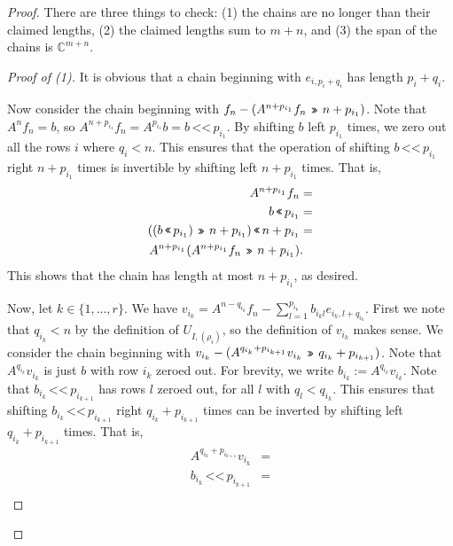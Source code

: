 \documentclass[12pt,psamsfonts]{article}
\newcommand{\leftshift}{\,\texttt{<<}\,}
\newcommand{\rightshift}{\mathbin{\rotatebox[origin=c]{180}{\leftshift}}}
\begin{document}
\begin{proof}
    There are three things to check: (1) the chains are no longer than their claimed lengths, (2) the claimed lengths sum to \(m + n\), and (3) the span of the chains is \(\mathbb{C}^{m + n}\).
    \begin{proof}[Proof of (1)]
        It is obvious that a chain beginning with \(e_{i, p_i + q_i}\) has length \(p_i + q_i\).
        \par Now consider the chain beginning with \(f_n - (A^{n + p_{i_1}} f_n \rightshift n + p_{i_1})\).
        Note that \(A^n f_n = b\), so \(A^{n + p_{i_1}} f_n = A^{p_{i_1}} b = b \leftshift p_{i_1}\).
        By shifting \(b\) left \(p_{i_1}\) times, we zero out all the rows \(i\) where \(q_i < n\).
        This ensures that the operation of shifting \(b \leftshift p_{i_1}\) right \(n + p_{i_1}\) times is invertible by shifting left \(n + p_{i_1}\) times.
        That is,
        \begin{align*}
            A^{n + p_{i_1}} f_n & = \\
            b \leftshift p_{i_1} & = \\
            ((b \leftshift p_{i_1}) \rightshift n + p_{i_1}) \leftshift n + p_{i_1} & = \\
            A^{n + p_{i_1}}(A^{n + p_{i_1}}f_n \rightshift n + p_{i_1}) & .
        \end{align*}
        This shows that the chain has length at most \(n + p_{i_1}\), as desired.
        \par Now, let \(k \in \{1, ..., r\}\).
        We have \(v_{i_k} = A^{n - q_{i_k}} f_n - \sum_{l = 1}^{p_{i_k}} b_{i_kl} e_{i_k,l + q_{i_k}}\).
        First we note that \(q_{i_k} < n\) by the definition of \(U_{I, (\rho_i)}\), so the definition of \(v_{i_k}\) makes sense.
        We consider the chain beginning with \(v_{i_k} - (A^{q_{i_k} + p_{i_{k + 1}}} v_{i_k} \rightshift q_{i_k} + p_{i_{k + 1}})\).
        Note that \(A^{q_{i_k}} v_{i_k}\) is just \(b\) with row \(i_k\) zeroed out.
        For brevity, we write \(b_{i_k} := A^{q_{i_k}} v_{i_k}\).
        Note that \(b_{i_k} \leftshift p_{i_{k + 1}}\) has rows \(l\) zeroed out, for all \(l\) with \(q_l < q_{i_k}\).
        This ensures that shifting \(b_{i_k} \leftshift p_{i_{k + 1}}\) right \(q_{i_k} + p_{i_{k + 1}}\) times can be inverted by shifting left \(q_{i_k} + p_{i_{k + 1}}\) times.
        That is,
        \begin{align*}
            A^{q_{i_k} + p_{i_{k + 1}}} v_{i_k} & = \\
            b_{i_k} \leftshift p_{i_{k + 1}} & = \\

\end{align*}
\end{proof}
\end{proof}
\end{document}
